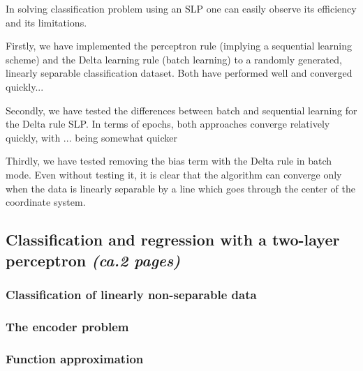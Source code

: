\documentclass[a4paper]{article}
\begin{document}
In solving classification problem using an SLP one can easily observe its efficiency and its limitations.

Firstly, we have implemented the perceptron rule (implying a sequential learning scheme) and the Delta learning rule (batch learning) to a randomly generated, linearly separable classification dataset. Both have performed well and converged quickly...

Secondly, we have tested the differences between batch and sequential learning for the Delta rule SLP. In terms of epochs, both approaches converge relatively quickly, with ... being somewhat quicker

Thirdly, we have tested removing the bias term with the Delta rule in batch mode. Even without testing it, it is clear that the algorithm can converge only when the data is linearly separable by a line which goes through the center of the coordinate system. 



\subsection{Classification and regression with a two-layer perceptron \textit{(ca.2 pages)}}

\subsubsection{Classification of linearly non-separable data}

\subsubsection{The encoder problem}

\subsubsection{Function approximation}
\end{document}
